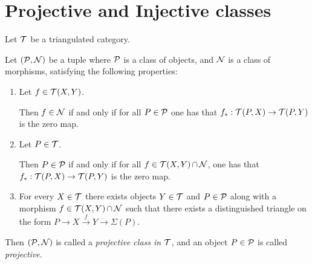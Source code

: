 \section{Projective and Injective classes}

\begin{definition} \label{def:projective_class}
    Let \( {\mathcal{T}} \) be a triangulated category.

    Let \( ({\mathcal{P}}, {\mathcal{N}}) \) be a tuple where \( {\mathcal{P}} \) is a class of objects, and \( {\mathcal{N}} \) is a class of morphisms, satisfying the following properties:

    \begin{enumerate}
        \item {Let \( f \in {\mathcal{T}}(X, Y) \).
        
        Then \( f \in {\mathcal{N}} \) if and only if for all \( P \in {\mathcal{P}} \) one has that \( f_*: {\mathcal{T}}(P, X) \to {\mathcal{T}}(P, Y) \) is the zero map.}

        \item {Let \( P \in {\mathcal{T}} \).
        
        Then \( P \in {\mathcal{P}} \) if and only if for all \( f \in {\mathcal{T}}(X, Y) \mathop{\cap}\limits {\mathcal{N}} \), one has that \( f_*: {\mathcal{T}}(P, X) \to {\mathcal{T}}(P, Y) \) is the zero map.}

        \item {For every \( X \in {\mathcal{T}} \) there exists objects \( Y \in {\mathcal{T}} \) and \( P \in {\mathcal{P}} \) along with a morphism \( f \in {\mathcal{T}}(X, Y) \mathop{\cap}\limits {\mathcal{N}} \) such that there exists a distinguished triangle on the form \( P \to X \stackrel{f}{\to} Y \to \Sigma(P) \).}
    \end{enumerate}

    Then \( ({\mathcal{P}}, {\mathcal{N}}) \) is called a \emph{projective class in \( {\mathcal{T}} \)}, and an object \( P \in {\mathcal{P}} \) is called \emph{projective}. %
\end{definition}

